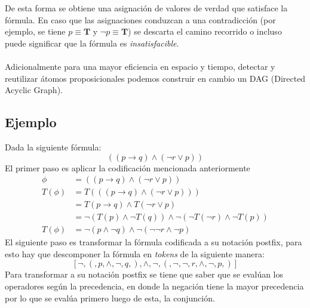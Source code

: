 \documentclass{report}
\begin{document}
	De esta forma se obtiene una asignaci\'on de valores de verdad que satisface la f\'ormula. En caso que las asignaciones conduzcan a una contradicci\'on (por ejemplo, se tiene $p \equiv \textbf{T}$ y $\neg p\equiv \textbf{T}$) se descarta el camino recorrido o incluso puede significar que la f\'ormula es \textit{insatisfacible}. \\\\
	Adicionalmente para una mayor eficiencia en espacio y tiempo, detectar y reutilizar \'atomos proposicionales podemos construir en cambio un DAG (Directed Acyclic Graph).
	\subsection{Ejemplo}
	Dada la siguiente f\'ormula:
	\[ ((p \rightarrow q) \wedge (\neg r \vee p)) \]
	El primer paso es aplicar la codificaci\'on mencionada anteriormente
	\begin{align*}
		\phi &= ((p \rightarrow q) \wedge (\neg r \vee p)) \\
		T(\phi) &= T(((p \rightarrow q) \wedge (\neg r \vee p)) ) \\
		&= T(p \rightarrow q) \wedge T(\neg r \vee p) \\
		&= \neg(T(p) \wedge \neg T(q)) \wedge \neg(\neg T(\neg r) \wedge \neg T(p)) \\
		T(\phi) &= \neg(p \wedge \neg q) \wedge \neg(\neg \neg r \wedge \neg p)
	\end{align*}
	El siguiente paso es transformar la f\'ormula codificada a su notaci\'on postfix, para esto hay que descomponer la f\'ormula en \textit{tokens} de la siguiente manera:
	\[ [\neg, (, p, \wedge, \neg, q, ), \wedge, \neg, (, \neg, \neg, r, \wedge, \neg, p, )] \]
	Para transformar a su notaci\'on postfix se tiene que saber que se eval\'uan los operadores seg\'un la precedencia, en donde la negaci\'on tiene la mayor precedencia por lo que se eval\'ua primero luego de esta, la conjunci\'on.
\end{document}
